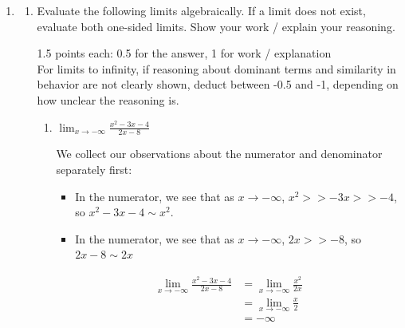 \documentclass{article}
\begin{document}
\begin{enumerate}
\begin{enumerate}

    \begin{solution}
      The only choice that matches the limits we found in
      \ref{limits-choose-graph-1-evaluate} is .
    \end{solution}

  \end{enumerate}

\item  \begin{enumerate}
  \item

    Evaluate the following limits algebraically. If a limit does not exist, evaluate both one-sided limits. Show your work / explain your reasoning.

    \begin{grading}
      1.5 points each: 0.5 for the answer, 1 for work / explanation\\
      For limits to infinity, if reasoning about dominant terms and similarity in behavior are not clearly shown, deduct between -0.5 and -1, depending on how unclear the reasoning is.
    \end{grading}      

    \begin{enumerate}

    \item

      \begin{problem}[\vfill]
        $\displaystyle \lim_{x \rightarrow -\infty} \frac{x^2 - 3x - 4}{2x - 8}$
      \end{problem}

      \begin{solution}
      We collect our observations about the numerator and denominator separately first:
      \begin{itemize}
          \item In the numerator, we see that as $x \to -\infty$, $x^2>>-3x>>-4$, so $x^2-3x-4 \sim x^2$.
          \item In the numerator, we see that as $x\to -\infty$, $2x>>-8$, so $2x-8 \sim 2x$
      \end{itemize}
        \begin{align*}
          \lim_{x \to -\infty} \frac{x^2 - 3x - 4}{2x - 8} &= \lim_{x \to -\infty} \frac{x^2}{2x} \\
          &= \lim_{x \to -\infty} \frac{x}{2} \\
          &= -\infty
        \end{align*}
      \end{solution}


\end{enumerate}
\end{enumerate}
\end{enumerate}
\end{document}
